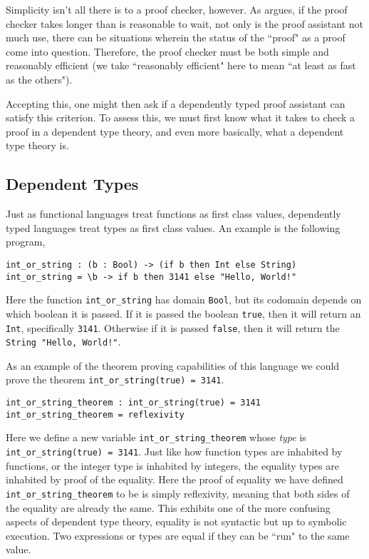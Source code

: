\documentclass[sigplan,nonacm]{acmart}
\begin{document}
Simplicity isn't all there is to a proof checker, however.
As \citet{Geuvers2008} argues, if the proof checker takes longer than is reasonable to wait, not only is the proof assistant not much use, there can be situations wherein the status of the ``proof" as a proof come into question.
Therefore, the proof checker must be both simple and reasonably efficient (we take ``reasonably efficient" here to mean ``at least as fast as the others").

Accepting this, one might then ask if a dependently typed proof assistant can satisfy this criterion.
To assess this, we must first know what it takes to check a proof in a dependent type theory, and even more basically, what a dependent type theory is.

\subsection{Dependent Types}
\label{sec:dependent-types}

Just as functional languages treat functions as first class values, dependently typed languages treat types as first class values.
An example is the following program, 

\begin{verbatim}
int_or_string : (b : Bool) -> (if b then Int else String)
int_or_string = \b -> if b then 3141 else "Hello, World!"
\end{verbatim}

Here the function \verb|int_or_string| has domain \texttt{Bool}, but its codomain depends on which boolean it is passed.
If it is passed the boolean \texttt{true}, then it will return an \texttt{Int}, specifically \texttt{3141}.
Otherwise if it is passed \texttt{false}, then it will return the \texttt{String "Hello, World!"}.

As an example of the theorem proving capabilities of this language we could prove the theorem \verb|int_or_string(true) = 3141|.

\begin{verbatim}
int_or_string_theorem : int_or_string(true) = 3141
int_or_string_theorem = reflexivity
\end{verbatim}

Here we define a new variable \verb|int_or_string_theorem| whose \textit{type} is \\ \verb|int_or_string(true) = 3141|.
Just like how function types are inhabited by functions, or the integer type is inhabited by integers, the equality types are inhabited by proof of the equality.
Here the proof of equality we have defined \verb|int_or_string_theorem| to be is simply reflexivity, meaning that both sides of the equality are already the same.
This exhibits one of the more confusing aspects of dependent type theory, equality is not syntactic but up to symbolic execution.
Two expressions or types are equal if they can be ``run" to the same value.
\end{document}
